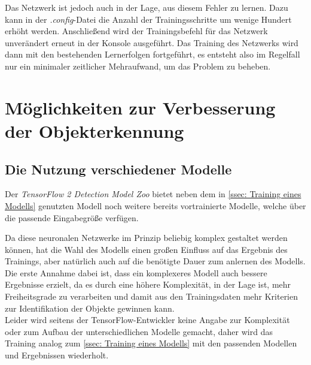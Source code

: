 \documentclass[12pt, oneside]{article}
\begin{document}
Das Netzwerk ist jedoch auch in der Lage, aus diesem Fehler zu lernen. Dazu kann in der \textit{.config}-Datei die Anzahl der Trainingsschritte um wenige Hundert erhöht werden. Anschließend wird der Trainingsbefehl für das Netzwerk unverändert erneut in der Konsole ausgeführt. Das Training des Netzwerks wird dann mit den bestehenden Lernerfolgen fortgeführt, es entsteht also im Regelfall nur ein minimaler zeitlicher Mehraufwand, um das Problem zu beheben.

\section{Möglichkeiten zur Verbesserung der Objekterkennung}

\subsection{Die Nutzung verschiedener Modelle}\label{ssec: Die Nutzung verschiedener Modelle}

Der \textit{TensorFlow 2 Detection Model Zoo} bietet neben dem in \autoref{ssec: Training eines Modells} genutzten Modell noch weitere bereits vortrainierte Modelle, welche über die passende Eingabegröße verfügen.

Da diese neuronalen Netzwerke im Prinzip beliebig komplex gestaltet werden können, hat die Wahl des Modells einen großen Einfluss auf das Ergebnis des Trainings, aber natürlich auch auf die benötigte Dauer zum anlernen des Modells.\\

Die erste Annahme dabei ist, dass ein komplexeres Modell auch bessere Ergebnisse erzielt, da es durch eine höhere Komplexität, in der Lage ist, mehr Freiheitsgrade zu verarbeiten und damit aus den Trainingsdaten mehr Kriterien zur Identifikation der Objekte gewinnen kann.\\

Leider wird seitens der TensorFlow-Entwickler keine Angabe zur Komplexität oder zum Aufbau der unterschiedlichen Modelle gemacht, daher wird das Training analog zum \autoref{ssec: Training eines Modells} mit den passenden Modellen und Ergebnissen wiederholt.\\
\end{document}
